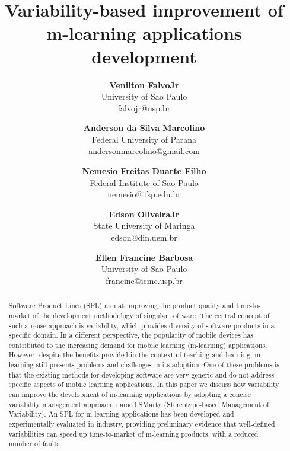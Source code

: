\documentclass[10pt,a4paper]{article}
\begin{document}
\title{Variability-based improvement of m-learning applications development}

\author{{\bfseries Venilton FalvoJr}\\
   University of Sao Paulo \\
   falvojr@usp.br
   \and
   {\bfseries Anderson da Silva Marcolino}\\
   Federal University of Parana \\
   andersonmarcolino@gmail.com
   \and
   {\bfseries Nemesio Freitas Duarte Filho}\\
   Federal Institute of Sao Paulo \\
   nemesio@ifsp.edu.br
   \and
   {\bfseries Edson OliveiraJr}\\
   State University of Maringa \\
   edson@din.uem.br
   \and
   {\bfseries Ellen Francine Barbosa}\\
   University of Sao Paulo \\
   francine@icmc.usp.br\\
}
\maketitle

\begin{abstract}
Software Product Lines (SPL) aim at improving the product quality and time-to-market of the development methodology of singular software. The central concept of such a reuse approach is variability, which provides diversity of software products in a specific domain. In a different perspective, the popularity of mobile devices has contributed to the increasing demand for mobile learning (m-learning) applications. However, despite the benefits provided in the context of teaching and learning, m-learning still presents problems and challenges in its adoption. One of these problems is that the existing methods for developing software are very generic and do not address specific aspects of mobile learning applications. In this paper we discuss how variability can improve the development of m-learning applications by adopting a concise variability management approach, named SMarty (Stereotype-based Management of Variability). An SPL for m-learning applications has been developed and experimentally evaluated in industry, providing preliminary evidence that well-defined variabilities can speed up time-to-market of m-learning products, with a reduced number of faults.
\end{abstract}
\end{document}
